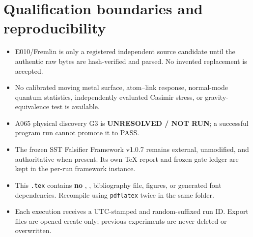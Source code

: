 \documentclass[10pt,a4paper]{article}
\begin{document}
\section{Qualification boundaries and reproducibility}
\begin{itemize}
\item E010/Fremlin is only a registered independent source candidate until the authentic raw bytes are hash-verified and parsed. No invented replacement is accepted.
\item No calibrated moving metal surface, atom--link response, normal-mode quantum statistics, independently evaluated Casimir stress, or gravity-equivalence test is available.
\item A065 physical discovery G3 is \textbf{UNRESOLVED / NOT RUN}; a successful program run cannot promote it to PASS.
\item The frozen SST Falsifier Framework v1.0.7 remains external, unmodified, and authoritative when present. Its own TeX report and frozen gate ledger are kept in the per-run framework instance.
\item This \texttt{.tex} contains \textbf{no} \verb||, \verb||, bibliography file, figures, or generated font dependencies. Recompile using \texttt{pdflatex} twice in the same folder.
\item Each execution receives a UTC-stamped and random-suffixed run ID. Export files are opened create-only; previous experiments are never deleted or overwritten.
\end{itemize}
\end{document}
